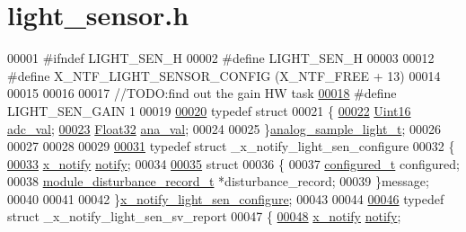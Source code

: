 \hypertarget{a00018_source}{\section{light\+\_\+sensor.\+h}
\label{a00018_source}
}

\begin{DoxyCode}
00001 \textcolor{preprocessor}{#ifndef LIGHT\_SEN\_H}
00002 \textcolor{preprocessor}{#define LIGHT\_SEN\_H}
00003 
00012 \textcolor{preprocessor}{#define X\_NTF\_LIGHT\_SENSOR\_CONFIG                                  (X\_NTF\_FREE + 13)}
00014 
00015 
00016 
00017 \textcolor{comment}{//TODO:find out the gain HW task}
\hypertarget{a00018_source_l00018}{}\hyperlink{a00018_a67d542941eaade236c5f5a224efc7653}{00018} \textcolor{preprocessor}{#define LIGHT\_SEN\_GAIN                                             1}
00019 
\hypertarget{a00018_source_l00020}{}\hyperlink{a00018}{00020} \textcolor{keyword}{typedef} \textcolor{keyword}{struct}
00021 \{
\hypertarget{a00018_source_l00022}{}\hyperlink{a00018_a891d4fcb12960785cecc1e688681b748}{00022}     \hyperlink{a00072_a59a9f6be4562c327cbfb4f7e8e18f08b}{Uint16}     \hyperlink{a00018_a891d4fcb12960785cecc1e688681b748}{adc\_val};
\hypertarget{a00018_source_l00023}{}\hyperlink{a00018_a053a8ae0e59f7414929cd8ac3feeec7b}{00023}     \hyperlink{a00072_a87d38f886e617ced2698fc55afa07637}{Float32}    \hyperlink{a00018_a053a8ae0e59f7414929cd8ac3feeec7b}{ana\_val};
00024 
00025 \}\hyperlink{a00018_dd/d42/a00109}{analog\_sample\_light\_t};
00026 
00027 
00028 
00029 
\hypertarget{a00018_source_l00031}{}\hyperlink{a00018}{00031} \textcolor{keyword}{typedef} \textcolor{keyword}{struct }\_x\_notify\_light\_sen\_configure
00032 \{
\hypertarget{a00018_source_l00033}{}\hyperlink{a00018_a8e6a04c2283f9fd7b8dcbc62faba5847}{00033}     \hyperlink{a00036_df/d4c/a00851}{x\_notify}           \hyperlink{a00018_a8e6a04c2283f9fd7b8dcbc62faba5847}{notify};
00034 
\hypertarget{a00018_source_l00035}{}\hyperlink{a00018}{00035}     \textcolor{keyword}{struct}
00036     \{
00037        \hyperlink{a00021_d6/d9c/a00352}{configured\_t}  configured;
00038        \hyperlink{a00028}{module\_disturbance\_record\_t}   *disturbance\_record;
00039     \}message;
00040 
00041 
00042 \}\hyperlink{a00018_da/de3/a00856}{x\_notify\_light\_sen\_configure};
00043 
00044 
\hypertarget{a00018_source_l00046}{}\hyperlink{a00018}{00046} \textcolor{keyword}{typedef} \textcolor{keyword}{struct }\_x\_notify\_light\_sen\_sv\_report
00047 \{
\hypertarget{a00018_source_l00048}{}\hyperlink{a00018_a8e6a04c2283f9fd7b8dcbc62faba5847}{00048}     \hyperlink{a00036_df/d4c/a00851}{x\_notify}            \hyperlink{a00018_a8e6a04c2283f9fd7b8dcbc62faba5847}{notify};

\end{DoxyCode}
